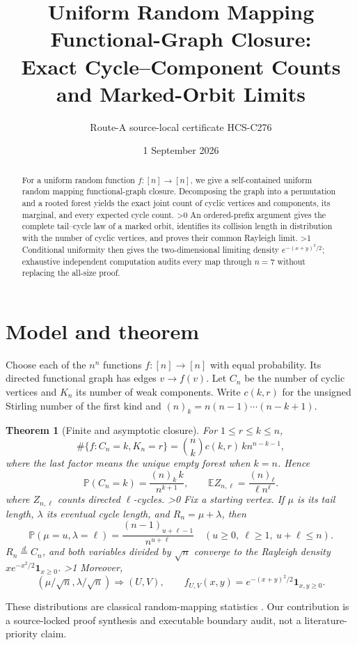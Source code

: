 \documentclass[10pt]{article}
\title{Uniform Random Mapping Functional-Graph Closure:\\
Exact Cycle--Component Counts and Marked-Orbit Limits}
\author{Route-A source-local certificate HCS-C276}
\date{1 September 2026}
\providecommand{\CRevisionRound}{2}
\newtheorem{theorem}{Theorem}
\newcommand{\Pp}{\mathbb P}
\newcommand{\Ee}{\mathbb E}
\newcommand{\fall}[2]{(#1)_{#2}}
\newcommand{\ind}{\mathbf 1}
\begin{document}
\maketitle

\begin{abstract}
For a uniform random function $f:[n]\to[n]$, we give a self-contained
uniform random mapping functional-graph closure.  Decomposing the graph into a
permutation and a rooted forest yields the exact joint count of cyclic vertices
and components, its marginal, and every expected cycle count.
\ifnum\CRevisionRound>0
An ordered-prefix argument gives the complete tail--cycle law of a marked
orbit, identifies its collision length in distribution with the number of
cyclic vertices, and proves their common Rayleigh limit.
\fi
\ifnum\CRevisionRound>1
Conditional uniformity then gives the two-dimensional limiting density
$e^{-(x+y)^2/2}$; exhaustive independent computation audits every map through
$n=7$ without replacing the all-size proof.
\fi
\end{abstract}

\section{Model and theorem}
Choose each of the $n^n$ functions $f:[n]\to[n]$ with equal probability.
Its directed functional graph has edges $v\to f(v)$.  Let $C_n$ be the number
of cyclic vertices and $K_n$ its number of weak components.  Write
$c(k,r)$ for the unsigned Stirling number of the first kind and
$\fall nk=n(n-1)\cdots(n-k+1)$.

\begin{theorem}[Finite and asymptotic closure]\label{thm:main}
For $1\le r\le k\le n$,
\begin{equation}
 \#\{f:C_n=k,K_n=r\}
 =\binom nk c(k,r)\,k n^{n-k-1},\label{eq:joint}
\end{equation}
where the last factor means the unique empty forest when $k=n$.  Hence
\begin{equation}
 \Pp(C_n=k)=\frac{\fall nk\,k}{n^{k+1}},\qquad
 \Ee Z_{n,\ell}=\frac{\fall n\ell}{\ell n^\ell}.\label{eq:marginal}
\end{equation}
where $Z_{n,\ell}$ counts directed $\ell$-cycles.
\ifnum\CRevisionRound>0
Fix a starting vertex.  If $\mu$ is its tail length, $\lambda$ its eventual
cycle length, and $R_n=\mu+\lambda$, then
\begin{equation}
 \Pp(\mu=u,\lambda=\ell)
 =\frac{\fall{n-1}{u+\ell-1}}{n^{u+\ell}}
 \quad(u\ge0,\ \ell\ge1,\ u+\ell\le n).\label{eq:marked}
\end{equation}
$R_n\overset d=C_n$, and both variables divided by $\sqrt n$ converge to the
Rayleigh density $x e^{-x^2/2}\ind_{x\ge0}$.
\fi
\ifnum\CRevisionRound>1
Moreover,
\begin{equation}
 (\mu/\sqrt n,\lambda/\sqrt n)\Rightarrow(U,V),\qquad
 f_{U,V}(x,y)=e^{-(x+y)^2/2}\ind_{x,y\ge0}.\label{eq:jointlimit}
\end{equation}
\fi
\end{theorem}
These distributions are classical random-mapping statistics
\cite{Harris1960,FO1990}.  Our contribution is a source-locked proof synthesis
and executable boundary audit, not a literature-priority claim.
\end{document}
